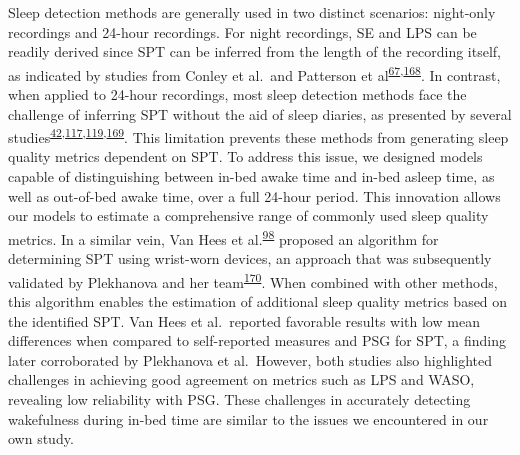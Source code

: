 \documentclass[
  10pt,
]{scrbook}
\begin{document}
Sleep detection methods are generally used in two distinct scenarios:
night-only recordings and 24-hour recordings. For night recordings, SE
and LPS can be readily derived since SPT can be inferred from the length
of the recording itself, as indicated by studies from Conley et al.~and
Patterson et
al\textsuperscript{\protect\hyperlink{ref-conley_agreement_2019}{67},\protect\hyperlink{ref-patterson_40_2023}{168}}.
In contrast, when applied to 24-hour recordings, most sleep detection
methods face the challenge of inferring SPT without the aid of sleep
diaries, as presented by several
studies\textsuperscript{\protect\hyperlink{ref-girschik_validation_2012}{42},\protect\hyperlink{ref-doherty_large_2017}{117},\protect\hyperlink{ref-anderson_assessment_2014}{119},\protect\hyperlink{ref-dozydave2023snooze}{169}}.
This limitation prevents these methods from generating sleep quality
metrics dependent on SPT. To address this issue, we designed models
capable of distinguishing between in-bed awake time and in-bed asleep
time, as well as out-of-bed awake time, over a full 24-hour period. This
innovation allows our models to estimate a comprehensive range of
commonly used sleep quality metrics. In a similar vein, Van Hees et
al.\textsuperscript{\protect\hyperlink{ref-van_hees_estimating_2018}{98}}
proposed an algorithm for determining SPT using wrist-worn devices, an
approach that was subsequently validated by Plekhanova and her
team\textsuperscript{\protect\hyperlink{ref-plekhanova_validation_2023}{170}}.
When combined with other methods, this algorithm enables the estimation
of additional sleep quality metrics based on the identified SPT. Van
Hees et al.~reported favorable results with low mean differences when
compared to self-reported measures and PSG for SPT, a finding later
corroborated by Plekhanova et al.~However, both studies also highlighted
challenges in achieving good agreement on metrics such as LPS and WASO,
revealing low reliability with PSG. These challenges in accurately
detecting wakefulness during in-bed time are similar to the issues we
encountered in our own study.
\end{document}
